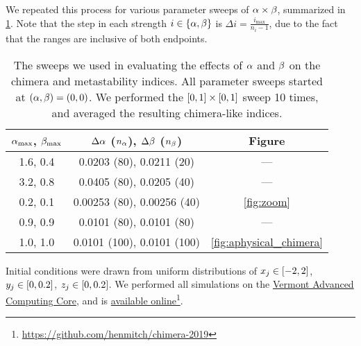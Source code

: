 We repeated this process for various parameter sweeps of $\alpha \times \beta$, summarized in \cref{tab:parameter_sweeps}.
Note that the step in each strength $i \in \Bqty{\hra, \hrb}$ is $\Delta i = \frac{i_{\text{max}}}{n_{i} - 1}$, due to the fact that the ranges are inclusive of both endpoints.
\begin{table}[ht]
  \centering
  \begin{tabular}{c | c | c}
    $\alpha_{\text{max}}$, $\beta_{\text{max}}$ & $\Delta \alpha$ ($n_{\alpha}$), $\Delta \beta$ ($n_{\beta}$) & Figure \\ \hline
    1.6, 0.4 & 0.0203 (80), 0.0211 (20) & --- \\
    3.2, 0.8 & 0.0405 (80), 0.0205 (40) & --- \\
    0.2, 0.1 & 0.00253 (80), 0.00256 (40) & \cref{fig:zoom} \\
    0.9, 0.9 & 0.0101 (80), 0.0101 (80) & --- \\
    1.0, 1.0 & 0.0101 (100), 0.0101 (100) & \cref{fig:aphysical_chimera}
  \end{tabular}
  \caption[Parameter sweeps]{The sweeps we used in evaluating the effects of $\alpha$ and $\beta$ on the chimera and metastability indices.
    All parameter sweeps started at $(\alpha, \beta) = (0, 0)$.
    We performed the $\bqty{0, 1} \times \bqty{0, 1}$ sweep 10 times, and averaged the resulting chimera-like indices.
  }
  \label{tab:parameter_sweeps}
\end{table}

Initial conditions were drawn from uniform distributions of $x_{j} \in \bqty{-2, 2}$, $y_{j} \in \bqty{0, 0.2}$, $z_{j} \in \bqty{0, 0.2}$.
We performed all simulations on the \href{https://www.uvm.edu/vacc}{Vermont Advanced Computing Core}, and is \href{https://github.com/henmitch/chimera-2019}{available online}\footnote{\href{https://github.com/henmitch/chimera-2019}{https://github.com/henmitch/chimera-2019}}.

